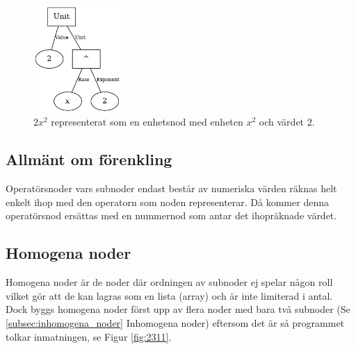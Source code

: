 \documentclass[12pt,a4paper]{article}
\begin{document}
\begin{figure}[h]
  \centering
  \includegraphics[width=0.3\textwidth]{image25}
  \caption{\(2x^{2}\) representerat som en enhetsnod med enheten \(x^{2}\) och värdet \(2\).}
  \label{fig:2132}
\end{figure}
\subsection{Allmänt om förenkling}
Operatörsnoder vars subnoder endast består av numeriska värden räknas helt enkelt ihop med den operatorn som noden representerar. Då kommer denna operatörsnod ersättas med en nummernod som antar det ihopräknade värdet.
\subsection{Homogena noder}
\label{subsec:homogena}
Homogena noder är de noder där ordningen av subnoder ej spelar någon roll vilket gör att de kan lagras som en lista (array) och är inte limiterad i antal. Dock byggs homogena noder först upp av flera noder med bara två subnoder (Se \ref{subsec:inhomogena_noder} Inhomogena noder) eftersom det är så programmet tolkar inmatningen, se Figur \ref{fig:2311}.
\end{document}
